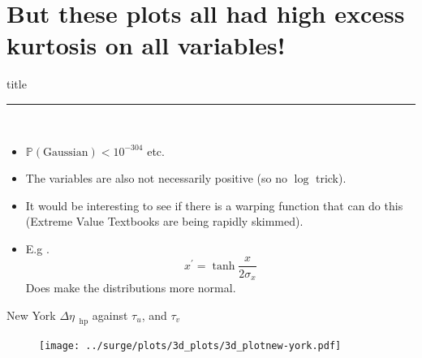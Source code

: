 \documentclass[usenames, dvipsnames]{beamer}
\begin{document}
\section{But these plots all had high excess kurtosis on all variables!  }
    \begin{frame}[plain]
        \vfill
      \centering
      \begin{beamercolorbox}[sep=8pt,center,shadow=true,rounded=true]{title}
        \insertsectionhead\par%
        \color{oxfordblue}\noindent\rule{10cm}{1pt} \\
        \begin{itemize}
        \item$\mathbb{P}(\mathrm{Gaussian})<10^{-304}$ etc.
        \item The variables are also not necessarily positive (so no $\log$ trick).
        \item It would be interesting to see if there is a warping function
         that can do this (Extreme Value Textbooks are being rapidly skimmed).
        \item E.g .       \begin{equation}
       x^{\prime} = \tanh{\frac{x}{2\sigma_x}} \text{}
       \end{equation}
       Does make the distributions more normal.
        \end{itemize}
      \end{beamercolorbox}
      \vfill
  \end{frame}


\begin{frame}{New York $\Delta\eta_{\;\;\mathrm{hp}}$ against $\tau_u$, and $\tau_v$}
\vspace{-30pt}
\hspace{-30pt}
 \begin{minipage}{1.1\textwidth}

\begin{figure}[htb!]
    \centering
   \hspace{-40pt} \texttt{[image: ../surge/plots/3d\_plots/3d\_plotnew-york.pdf]}
    \vspace{-15pt}
    \label{fig:A}
\end{figure}
\end{minipage}
\end{frame}
\end{document}
